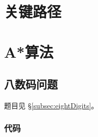 \section{关键路径} %

\section{A*算法} %
\label{sec:astar}

\subsection{八数码问题}
题目见 \S \ref{subsec:eightDigits}。

\subsubsection{代码}
